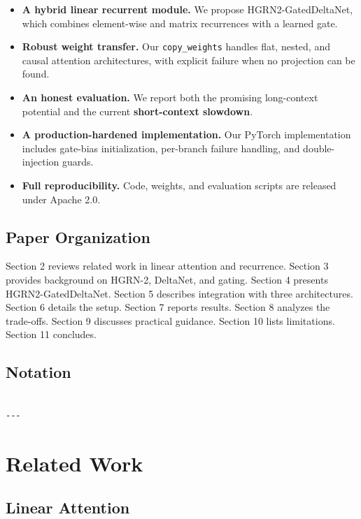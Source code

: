 \begin{itemize}
\item \textbf{A hybrid linear recurrent module.} We propose HGRN2-GatedDeltaNet,
  which combines element-wise and matrix recurrences with a learned gate.
\item \textbf{Robust weight transfer.} Our \texttt{copy\_weights} handles flat, nested, and
  causal attention architectures, with explicit failure when no projection
  can be found.
\item \textbf{An honest evaluation.} We report both the promising long-context potential
  and the current \textbf{short-context slowdown}.
\item \textbf{A production-hardened implementation.} Our PyTorch implementation
  includes gate-bias initialization, per-branch failure handling, and
  double-injection guards.
\item \textbf{Full reproducibility.} Code, weights, and evaluation scripts are
  released under Apache 2.0.

\end{itemize}
\subsection{Paper Organization}

Section 2 reviews related work in linear attention and recurrence. Section 3 
provides background on HGRN-2, DeltaNet, and gating. Section 4 presents 
HGRN2-GatedDeltaNet. Section 5 describes integration with three architectures. 
Section 6 details the setup. Section 7 reports results. Section 8 analyzes 
the trade-offs. Section 9 discusses practical guidance. Section 10 lists 
limitations. Section 11 concludes.



\subsection{Notation}

\begin{lstlisting}

---
\end{lstlisting}

\section{Related Work}

\subsection{Linear Attention}

